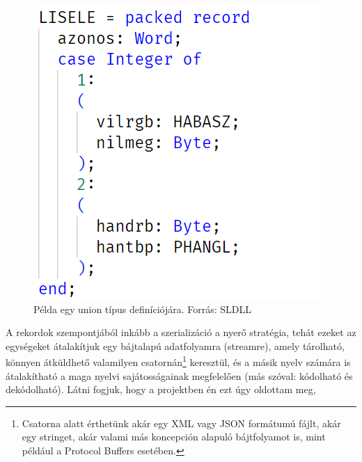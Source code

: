 \documentclass[tocnopagenum]{thesis-ekf}
\theoremstyle{definition}
\theoremstyle{remark}
\begin{document}
	\begin{figure}[h!]
		\centering
		\includegraphics[scale=0.85]{sldll_union}
		\caption{Példa egy union típus definíciójára. Forrás: SLDLL}
		\label{fig:sldll_union}
	\end{figure}
	
	A rekordok szempontjából inkább a szerializáció a nyerő stratégia, tehát ezeket az egységeket átalakítjuk egy bájtalapú adatfolyamra (streamre), amely tárolható, könnyen átküldhető valamilyen csatornán\footnote{Csatorna alatt érthetünk akár egy XML vagy JSON formátumú fájlt, akár egy stringet, akár valami más koncepción alapuló bájtfolyamot is, mint például a Protocol Buffers esetében.} keresztül, és a másik nyelv számára is átalakítható a maga nyelvi sajátosságainak megfelelően (más szóval: kódolható és dekódolható).
	Látni fogjuk, hogy a projektben én ezt úgy oldottam meg,
\end{document}

